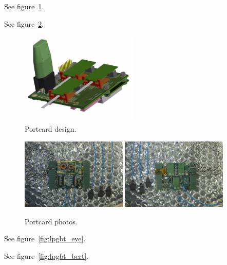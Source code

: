 \documentclass[a4paper,11pt]{article}
\begin{document}
See figure~\ref{fig:port_card_design}.

See figure~\ref{fig:port_card_pics}.

\begin{figure}[htbp]
\centering
\includegraphics[width=0.5\textwidth,origin=c]{../figures/port_card_design.png}
\caption{
\label{fig:port_card_design}
Portcard design.
}
\end{figure}

\begin{figure}[htbp]
\centering
\includegraphics[width=0.45\textwidth,origin=c]{../figures/port_card_front.jpeg}
\qquad
\includegraphics[width=0.45\textwidth,origin=c]{../figures/port_card_back.jpeg}
\caption{
\label{fig:port_card_pics}
Portcard photos.
}
\end{figure}

See figure~\ref{fig:lpgbt_eye}.

See figure~\ref{fig:lpgbt_bert}.
\end{document}
